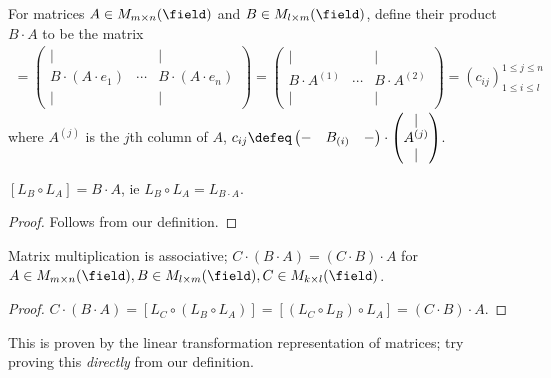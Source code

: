\begin{definition}
    For matrices $A \in M_{m \times n}(\field)$ and $B \in M_{l \times m}(\field)$, define their product $B \cdot A$ to be the matrix \begin{align*}
        [L_B \circ L_A] =
        \begin{pmatrix}
            \vert &  & \vert\\
            B\cdot (A \cdot e_1) & \cdots & B \cdot (A \cdot e_n)\\
            \vert & & \vert
        \end{pmatrix} = \begin{pmatrix}
            \vert & & \vert\\
            B \cdot A^{(1)} &\cdots & B \cdot A^{(2)}\\
            \vert & & \vert
        \end{pmatrix} = \left(c_{ij}\right)_{1 \leq i \leq l}^{1 \leq j \leq n}
    \end{align*}
    where $A^{(j)}$ is the $j$th column of $A$, $c_{ij} \defeq \begin{pmatrix}
        - & B_{(i)} & - 
    \end{pmatrix} \cdot \begin{pmatrix}
        \vert \\
        A^{(j)}\\
        \vert
    \end{pmatrix}$.
\end{definition}

\begin{proposition}
    $[L_B \circ L_A] = B \cdot A$, ie $L_B \circ L_A = L_{B \cdot A}$.
\end{proposition}
\begin{proof}
    Follows from our definition.
\end{proof}

\begin{corollary}
    Matrix multiplication is associative; $C \cdot (B \cdot A) = (C \cdot B) \cdot A$ for $A \in M_{m \times n}(\field), B \in M_{l \times m}(\field), C \in M_{k \times l}(\field)$.
\end{corollary}
\begin{proof}
    $C\cdot (B \cdot A) = [L_C \circ (L_B \circ L_A)] = [(L_C\circ L_B) \circ L_A] = (C \cdot B) \cdot A$.
\end{proof}

\begin{remark}
    This is proven by the linear transformation representation of matrices; try proving this \emph{directly} from our definition.
\end{remark}

